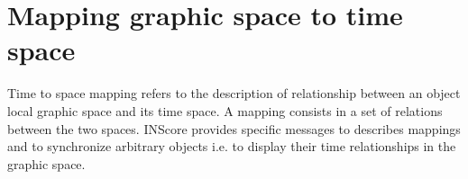 \documentclass[a4paper,twoside]{report}
\newcommand{\toplevel}[1]	{\chapter{#1}}
\newcommand{\OSC}[1]		{\texttt{#1}}
\let\olditemize\itemize
\let\oldenditemize\enditemize
\renewenvironment{itemize} 	{\olditemize \setlength{\itemsep}{1mm}}{\oldenditemize}
\begin{document}


\toplevel{Mapping graphic space to time space}
\label{mapping}

Time to space mapping refers to the description of relationship between an object local graphic space and its time space. A mapping consists in a set of relations between the two spaces. INScore provides specific messages to describes mappings and to synchronize arbitrary objects i.e. to display their time relationships in the graphic space.
\end{document}

